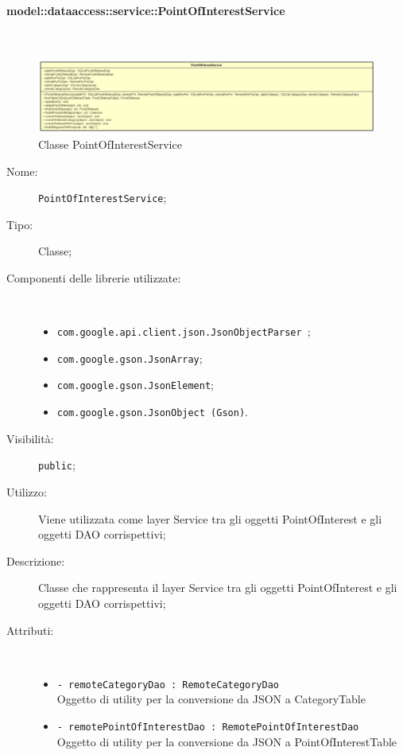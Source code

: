 \documentclass[../DefinizioneDiProdotto.tex]{subfiles}
\begin{document}
\paragraph{model::dataaccess::service::PointOfInterestService}
\
\begin{figure}[H]
	\centering
	\includegraphics[width=\maxwidth]{img/PointOfInterestService.png}
	\caption{Classe PointOfInterestService}\label{fig:model::dataaccess::service::PointOfInterestService} 
\end{figure}
\begin{description}
	\item[Nome:] \texttt{PointOfInterestService};
	\item[Tipo:] Classe;
	\item[Componenti delle librerie utilizzate:] \
	\begin{itemize}
		\item \texttt{com.google.api.client.json.JsonObjectParser
		};
		
		\item \texttt{com.google.gson.JsonArray};
		
		\item \texttt{com.google.gson.JsonElement};
		
		\item \texttt{com.google.gson.JsonObject (Gson)}.
		
	\end{itemize}
	\item[Visibilità:] \texttt{public};
	\item[Utilizzo:] Viene utilizzata come layer Service tra gli oggetti PointOfInterest e gli oggetti DAO corrispettivi;
	\item[Descrizione:] Classe che rappresenta il layer Service tra gli oggetti PointOfInterest e gli oggetti DAO corrispettivi;
	\item[Attributi:] \
	\begin{itemize}
		\item \texttt{- remoteCategoryDao : RemoteCategoryDao}\\
		Oggetto di utility per la conversione da JSON a CategoryTable
		
		\item \texttt{- remotePointOfInterestDao : RemotePointOfInterestDao}\\
		Oggetto di utility per la conversione da JSON a PointOfInterestTable
		

\end{itemize}
\end{description}
\end{document}
